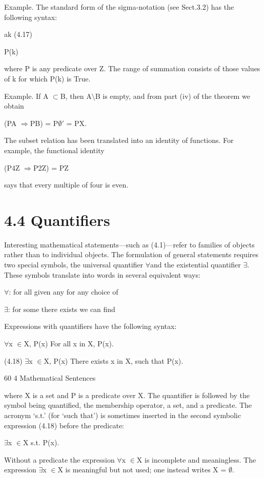 \documentclass[11pt]{article}
\theoremstyle{plain}
\theoremstyle{definition}
\begin{document}
Example. The standard form of the sigma-notation (see Sect.3.2) has the following syntax:

ak (4.17)

P(k)

where P is any predicate over Z. The range of summation consists of those values of k for which P(k) is True.

Example. If A $\subset$B, then A$\setminus$B is empty, and from part (iv) of the theorem we obtain

(PA $\Rightarrow$PB) = P$\emptyset$$'$ = PX.

The subset relation has been translated into an identity of functions. For example, the functional identity

(P4Z $\Rightarrow$P2Z) = PZ

says that every multiple of four is even.

\section{4.4 Quantifiers}

Interesting mathematical statements---such as (4.1)---refer to families of objects rather than to individual objects. The formulation of general statements requires two special symbols, the universal quantifier $\forall$and the existential quantifier $\exists$. These symbols translate into words in several equivalent ways:

$\forall$: for all given any for any choice of

$\exists$: for some there exists we can find

Expressions with quantifiers have the following syntax:

$\forall$x $\in$X, P(x) For all x in X, P(x).

(4.18) $\exists$x $\in$X, P(x) There exists x in X, such that P(x).

60 4 Mathematical Sentences

where X is a set and P is a predicate over X. The quantifier is followed by the symbol being quantified, the membership operator, a set, and a predicate. The acronym `s.t.' (for `such that') is sometimes inserted in the second symbolic expression (4.18) before the predicate:

$\exists$x $\in$X s.t. P(x).

Without a predicate the expression $\forall$x $\in$X is incomplete and meaningless. The expression $\exists$x $\in$X is meaningful but not used; one instead writes X = $\emptyset$.
\end{document}
